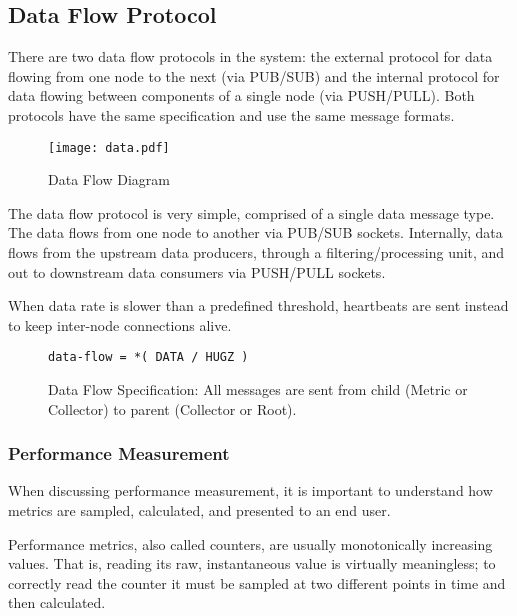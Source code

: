\subsection{Data Flow Protocol}
\label{proto_data}

There are two data flow protocols in the \dcamp system: the external protocol for data flowing from one node to the next
(via PUB/SUB) and the internal protocol for data flowing between components of a single node (via PUSH/PULL). Both
protocols have the same specification and use the same message formats.

\begin{figure}[H]
    \centering
    \texttt{[image: data.pdf]}
    \caption{Data Flow Diagram}
    \label{fig:proto_data_image}
\end{figure}

The \dcamp data flow protocol is very simple, comprised of a single data message type. The data flows from one node to
another via PUB/SUB sockets. Internally, data flows from the upstream data producers, through a filtering/processing
unit, and out to downstream data consumers via PUSH/PULL sockets.

When data rate is slower than a predefined threshold, heartbeats are sent instead to keep inter-node connections alive.

\begin{figure}[H]
\vspace{+10pt}
\begin{verbatim}
data-flow = *( DATA / HUGZ )
\end{verbatim}
\vspace{-5pt}
\caption[Data Flow Specification]
	{Data Flow Specification: All messages are sent from child (Metric or Collector) to parent (Collector or Root).}
\label{fig:proto_data_spec}
\end{figure}

\subsubsection{Performance Measurement}

When discussing performance measurement, it is important to understand how metrics are sampled, calculated, and
presented to an end user.

Performance metrics, also called counters, are usually monotonically increasing values. That is, reading its raw,
instantaneous value is virtually meaningless; to correctly read the counter it must be sampled at two different points
in time and then calculated.

